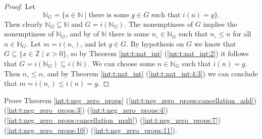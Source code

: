 \begin{proof}
	Let
	$$
		\mathbb{N}_{G} = \{ a \in \mathbb{N} \mid \text{there is some } g \in G \text{ such that } i(a) = g \}.
	$$
	Then clearly $\mathbb{N}_{G} \subseteq \mathbb{N}$ and $G = i(\mathbb{N}_{G})$. The nonemptiness of $G$ implies the nonemptiness of $\mathbb{N}_{G}$, and by  of $\mathbb{N}$ there is some $n_{\circ} \in \mathbb{N}_{G}$ such that $n_{\circ} \leq n$ for all ${n \in \mathbb{N}_{G}}$. Let $m = i(n_{\circ})$, and let $g \in G$. By hypothesis on $G$ we know that ${G \subseteq \{ x \in \mathbb{Z} \mid x > 0 \}}$, so by Theorem \ref{int:t:nat_int} (\ref{int:t:nat_int:2}) it follows that $G = i(\mathbb{N}_{G}) \subseteq i(\mathbb{N})$. We can choose some $n \in \mathbb{N}_{G}$ such that $i(n) = g$. Then $n_{\circ} \leq n$, and by Theorem \ref{int:t:nat_int} (\ref{int:t:nat_int:4:3}) we can conclude that $m = i(n_{\circ}) \leq i(n) = g$.
\end{proof}


\Newpage
\begin{exercise} %
	\label{int:e:11}
	Prove Theorem \ref{int:t:neg_zero_props} (\ref{int:t:neg_zero_props:cancellation_add}) (\ref{int:t:neg_zero_props:3}) (\ref{int:t:neg_zero_props:4}) (\ref{int:t:neg_zero_props:cancellation_mult}) (\ref{int:t:neg_zero_props:7}) (\ref{int:t:neg_zero_props:10}) (\ref{int:t:neg_zero_props:11}).
\end{exercise}

